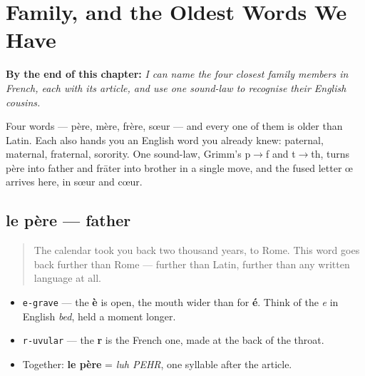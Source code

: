 
\chapter{Family, and the Oldest Words We Have}
\label{ch:family}

\begin{chapteropening}
\textbf{By the end of this chapter:} \emph{I can name the four closest family members in French, each with its article, and use one sound-law to recognise their English cousins.}

Four words — père, mère, frère, sœur — and every one of them is older than Latin. Each also hands you an English word you already knew: paternal, maternal, fraternal, sorority. One sound-law, Grimm's p$\to$f and t$\to$th, turns père into father and frāter into brother in a single move, and the fused letter œ arrives here, in sœur and cœur.
\end{chapteropening}

\section[le père]{le père — father}

\label{lesson:FR-C10-pere}



\begin{quote}
The calendar took you back two thousand years, to Rome. This word goes back further than Rome — further than Latin, further than any written language at all.
\end{quote}

\begin{sounds}
\begin{itemize}
\raggedright
  \item \texttt{e-grave} — the \textbf{è} is open, the mouth wider than for \textbf{é}. Think of the \emph{e} in English \emph{bed}, held a moment longer.
  \item \texttt{r-uvular} — the \textbf{r} is the French one, made at the back of the throat.
  \item Together: \textbf{le père} = \emph{luh PEHR}, one syllable after the article.
\end{itemize}
\end{sounds}

